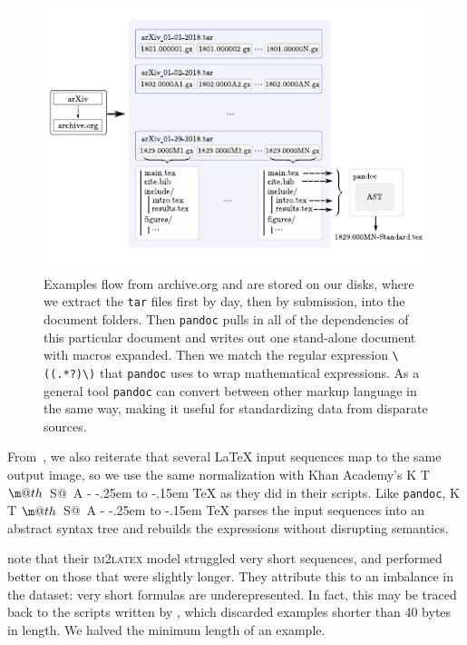 \documentclass{article}
\makeatletter
\DeclareRobustCommand{\KaTeX}{K%
  {%
    \setbox0\hbox{T}%
    \setbox\@tempboxa\hbox{$\m@th$%
      \csname S@\f@size\endcsname
      \fontsize\sf@size\z@
      \math@fontsfalse\selectfont
      A}%
    \@tempdima\ht0
    \advance\@tempdima-\ht\@tempboxa
    \@tempdima\strip@pt\fontdimen1\font\@tempdima
    \advance\@tempdima-.25em
    \kern\@tempdima
    \vbox to\ht0{\box\@tempboxa
      \vss}%
  }%
  \kern-.15em
  \TeX}
\makeatother
\begin{document}
\begin{figure}[]
		\includegraphics[scale=1.7]{assets/harvest.pdf}
    \centering
    \cprotect\caption{Examples flow from archive.org and are stored on our
    disks, where we extract the \texttt{tar} files first by day, then by
    submission, into the document folders. Then \texttt{pandoc} pulls in all of
    the dependencies of this particular document and writes out one stand-alone
    document with macros expanded. Then we match the regular expression
    \verb|\((.*?)\)| that \texttt{pandoc} uses to wrap mathematical expressions.
    As a general tool \texttt{pandoc} can convert between other markup language
    in the same way, making it useful for standardizing data from disparate
    sources.}\label{datapipeline}
\end{figure}

From~\citeauthor{deng2016you}, we also reiterate that several \LaTeX{} input sequences
map to the same output image, so we use the same normalization with Khan
Academy's \KaTeX{} as they did in their scripts. Like \texttt{pandoc}, \KaTeX{}
parses the input sequences into an abstract syntax tree and rebuilds the
expressions without disrupting
semantics. %

\citeauthor[5]{bender2019learning} note that their \textsc{im2latex} model struggled
very short sequences, and performed better on those that were slightly longer.
They attribute this to an imbalance in the dataset: very short formulas are
underepresented. In fact, this may be traced back to the scripts written by
\cite{deng2016you}, which discarded examples shorter than 40 bytes in length. We
halved the minimum length of an example.
\end{document}
